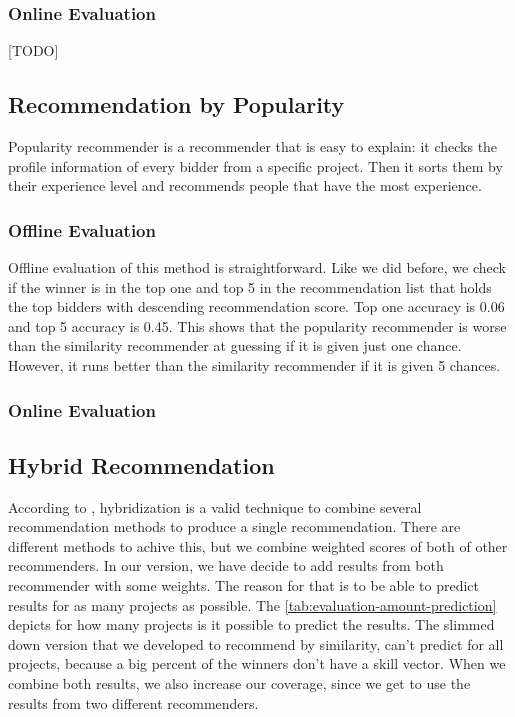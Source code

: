 \subsubsection{Online Evaluation}

[TODO]

\subsection{Recommendation by Popularity}\label{subsubsection:eval-popularity}

Popularity recommender is a recommender that is easy to explain: it checks the profile information of every bidder from a specific project. Then it sorts them by their experience level and recommends people that have the most experience. 

\subsubsection{Offline Evaluation}

Offline evaluation of this method is straightforward. Like we did before, we check if the winner is in the top one and top 5 in the recommendation list that holds the top bidders with descending recommendation score. Top one accuracy is 0.06 and top 5 accuracy is 0.45. This shows that the popularity recommender is worse than the similarity recommender at guessing if it is given just one chance. However, it runs better than the similarity recommender if it is given 5 chances. 

\subsubsection{Online Evaluation}

\subsection{Hybrid Recommendation}

According to \cite{burke2002hybrid}, hybridization is a valid technique to combine several recommendation methods to produce a single recommendation. There are different methods to achive this, but we combine weighted scores of both of other recommenders. In our version, we have decide to add results from both recommender with some weights. The reason for that is to be able to predict results for as many projects as possible. The \ref{tab:evaluation-amount-prediction} depicts for how many projects is it possible to predict the results. The slimmed down version that we developed to recommend by similarity, can't predict for all projects, because a big percent of the winners don't have a skill vector. When we combine both results, we also increase our coverage, since we get to use the results from two different recommenders.

